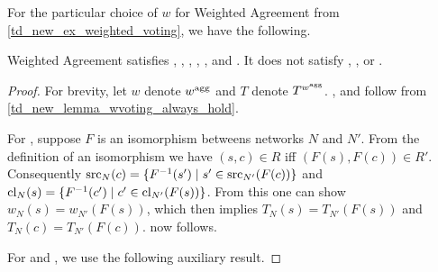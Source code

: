 For the particular choice of $w$ for Weighted Agreement from
\cref{td_new_ex_weighted_voting}, we have the following.

\begin{theorem}
    Weighted Agreement satisfies \claimcoherence{}, \symmetry{},
    \freshposresp{}, \sourceposresp{}, \marginaltrustworthiness{},
    \trustbasedmon{} and \disjointindependence{}. It does not satisfy
    \sourcecoherence{}, \classicalindependence{}, \conflictcoherence{} or
    \anticoherence{}.
\end{theorem}

\begin{proof}
    For brevity, let $w$ denote $w^{\operatorname{agg}}$ and $T$ denote $T^{w^{\operatorname{agg}}}$.
    \claimcoherence{}, \marginaltrustworthiness{} and \trustbasedmon{} follow
    from \cref{td_new_lemma_wvoting_always_hold}.

    For \symmetry{}, suppose $F$ is an isomorphism betweens networks $N$ and
    $N'$. From the definition of an isomorphism we have $(s, c) \in R$ iff
    $(F(s), F(c)) \in R'$. Consequently $\operatorname{src}_N(c) = \{F^{-1}(s') \mid s' \in
    \operatorname{src}_{N'}(F(c))\}$ and $\operatorname{cl}_N(s) = \{F^{-1}(c') \mid c' \in
    \operatorname{cl}_{N'}(F(s))\}$. From this one can show $w_N(s) = w_{N'}(F(s))$,
    which then implies $T_N(s) = T_{N'}(F(s))$ and $T_N(c) = T_{N'}(F(c))$.
    \symmetry{} now follows.

    For \freshposresp{} and \sourceposresp{}, we use the following auxiliary
    result.


\end{proof}
